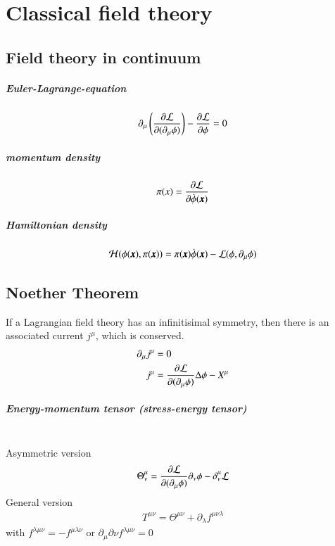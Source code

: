 \chapter{Classical field theory}
\setcounter{chapter}{1}
\section{Field theory in continuum}
\paragraph{Euler-Lagrange-equation}
\begin{align}
	\partial_\mu \left( \frac{\partial \mathcal{L}}{\partial(\partial_\mu \phi)} \right) - \frac{\partial \mathcal{L}}{\partial \phi} = 0
\end{align}
\paragraph{momentum density}
\begin{align}
	\pi(x) = \frac{\partial \mathcal{L}}{\partial \dot{\phi}(\pmb{x})}
\end{align}
\paragraph{Hamiltonian density}
\begin{align}
	\mathcal{H}(\phi(\pmb{x}),\pi(\pmb{x})) = \pi(\pmb{x}) \dot{\phi}(\pmb{x}) - \mathcal{L}(\phi,\partial_\mu \phi)
\end{align}
\section{Noether Theorem}
If a Lagrangian field theory has an infinitisimal symmetry, then there is an associated current $j^\mu$, which is conserved.
\begin{align}
	\partial_\mu j^\mu &= 0 \\
	j^\mu &= \frac{\partial \mathcal{L}}{\partial (\partial_\mu \phi)} \Delta \phi - X^\mu
\end{align}
\paragraph{Energy-momentum tensor (stress-energy tensor)} \hspace{0pt}\\
Asymmetric version
\begin{align}
	\Theta^\mu_\nu = \frac{\partial \mathcal{L}}{\partial(\partial_\mu \phi)} \partial_\nu \phi - \delta^\mu_\nu \mathcal{L}
\end{align}
General version
\begin{align}
	T^{\mu\nu} = \Theta^{\mu\nu} + \partial_\lambda f^{\mu\nu\lambda}
\end{align}
with $f^{\lambda\mu\nu}=-f^{\mu\lambda\nu}$ or $\partial_\mu \partial\nu f^{\lambda\mu\nu}=0$

